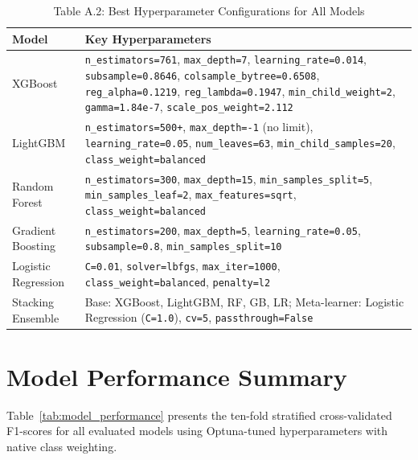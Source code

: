 \begin{table}[H]
\centering
\caption{Table A.2: Best Hyperparameter Configurations for All Models}
\label{tab:all_params}
\small
\begin{tabular}{p{3.2cm}p{9.5cm}}
\toprule
\textbf{Model} & \textbf{Key Hyperparameters} \\
\midrule
XGBoost
  & \texttt{n\_estimators=761}, \texttt{max\_depth=7}, \texttt{learning\_rate=0.014},
    \texttt{subsample=0.8646}, \texttt{colsample\_bytree=0.6508},
    \texttt{reg\_alpha=0.1219}, \texttt{reg\_lambda=0.1947},
    \texttt{min\_child\_weight=2}, \texttt{gamma=1.84e-7},
    \texttt{scale\_pos\_weight=2.112} \\
\addlinespace
LightGBM
  & \texttt{n\_estimators=500+}, \texttt{max\_depth=-1} (no limit),
    \texttt{learning\_rate=0.05}, \texttt{num\_leaves=63},
    \texttt{min\_child\_samples=20}, \texttt{class\_weight=balanced} \\
\addlinespace
Random Forest
  & \texttt{n\_estimators=300}, \texttt{max\_depth=15},
    \texttt{min\_samples\_split=5}, \texttt{min\_samples\_leaf=2},
    \texttt{max\_features=sqrt}, \texttt{class\_weight=balanced} \\
\addlinespace
Gradient Boosting
  & \texttt{n\_estimators=200}, \texttt{max\_depth=5},
    \texttt{learning\_rate=0.05}, \texttt{subsample=0.8},
    \texttt{min\_samples\_split=10} \\
\addlinespace
Logistic Regression
  & \texttt{C=0.01}, \texttt{solver=lbfgs}, \texttt{max\_iter=1000},
    \texttt{class\_weight=balanced}, \texttt{penalty=l2} \\
\addlinespace
Stacking Ensemble
  & Base: XGBoost, LightGBM, RF, GB, LR;
    Meta-learner: Logistic Regression (\texttt{C=1.0}),
    \texttt{cv=5}, \texttt{passthrough=False} \\
\bottomrule
\end{tabular}
\end{table}

\section{Model Performance Summary}

Table~\ref{tab:model_performance} presents the ten-fold stratified cross-validated F1-scores for all evaluated models using Optuna-tuned hyperparameters with native class weighting.

